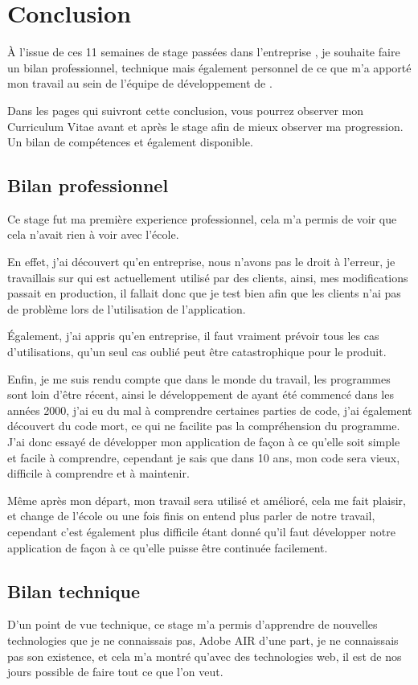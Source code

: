 ﻿\chapter{Conclusion}
\`A l'issue de ces 11 semaines de stage passées dans l'entreprise \mbx{}, je souhaite faire un bilan professionnel, technique mais également personnel de ce que m'a apporté mon travail au sein de l'équipe de développement de \adt{}.

Dans les pages qui suivront cette conclusion, vous pourrez observer mon Curriculum Vitae avant et après le stage afin de mieux observer ma progression. Un bilan de compétences et également disponible.
\section{Bilan professionnel}
    Ce stage fut ma première experience professionnel, cela m'a permis de voir que cela n'avait rien à voir avec l'école.

    En effet, j'ai découvert qu'en entreprise, nous n'avons pas le droit à l'erreur, je travaillais sur \adt{} qui est actuellement utilisé par des clients, ainsi, mes modifications passait en production, il fallait donc que je test bien afin que les clients n'ai pas de problème lors de l'utilisation de l'application.

    \'Egalement, j'ai appris qu'en entreprise, il faut vraiment prévoir tous les cas d'utilisations, qu'un seul cas oublié peut être catastrophique pour le produit.

    Enfin, je me suis rendu compte que dans le monde du travail, les programmes sont loin d'être récent, ainsi le développement de \adt{} ayant été commencé dans les années 2000, j'ai eu du mal à comprendre certaines parties de code, j'ai également découvert du code mort, ce qui ne facilite pas la compréhension du programme. J'ai donc essayé de développer mon application de façon à ce qu'elle soit simple et facile à comprendre, cependant je sais que dans 10 ans, mon code sera vieux, difficile à comprendre et à maintenir.

    Même après mon départ, mon travail sera utilisé et amélioré, cela me fait plaisir, et change de l'école ou une fois finis on entend plus parler de notre travail, cependant c'est également plus difficile étant donné qu'il faut développer notre application de façon à ce qu'elle puisse être continuée facilement.
\section{Bilan technique}
D'un point de vue technique, ce stage m'a permis d'apprendre de nouvelles technologies que je ne connaissais pas, Adobe AIR d'une part, je ne connaissais pas son existence, et cela m'a montré qu'avec des technologies web, il est de nos jours possible de faire tout ce que l'on veut.

